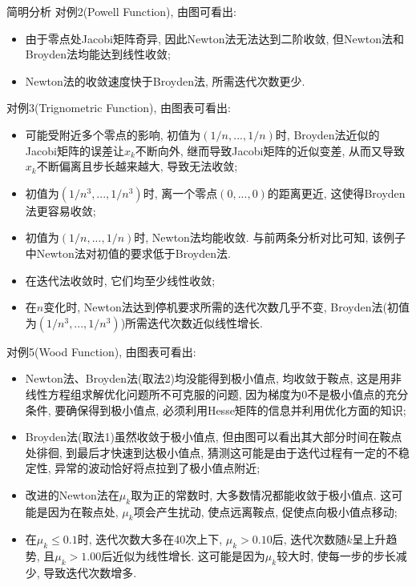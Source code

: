 \documentclass{article}
\begin{document}
\begin{section}{简明分析}
    \noindent 对例2(Powell Function), 由图可看出:
    \begin{itemize}
        \item 由于零点处Jacobi矩阵奇异, 因此Newton法无法达到二阶收敛, 但Newton法和Broyden法均能达到线性收敛; 
        \item Newton法的收敛速度快于Broyden法, 所需迭代次数更少.
    \end{itemize}

    \noindent 对例3(Trignometric Function), 由图表可看出:
    \begin{itemize}
        \item 可能受附近多个零点的影响, 初值为$(1/n,...,1/n)$时, Broyden法近似的Jacobi矩阵的误差让$x_k$不断向外, 继而导致Jacobi矩阵的近似变差, 从而又导致$x_k$不断偏离且步长越来越大, 导致无法收敛;
        \item 初值为$(1/n^3,...,1/n^3)$时, 离一个零点$(0,...,0)$的距离更近, 这使得Broyden法更容易收敛;
        \item 初值为$(1/n,...,1/n)$时, Newton法均能收敛. 与前两条分析对比可知, 该例子中Newton法对初值的要求低于Broyden法.
        \item 在迭代法收敛时, 它们均至少线性收敛; 
        \item 在$n$变化时, Newton法达到停机要求所需的迭代次数几乎不变, Broyden法(初值为$(1/n^3,...,1/n^3)$)所需迭代次数近似线性增长.
    \end{itemize}

    \noindent 对例5(Wood Function), 由图表可看出:
    \begin{itemize}
        \item Newton法、Broyden法(取法2)均没能得到极小值点, 均收敛于鞍点, 这是用非线性方程组求解优化问题所不可克服的问题, 因为梯度为0不是极小值点的充分条件, 
        要确保得到极小值点, 必须利用Hesse矩阵的信息并利用优化方面的知识;
        \item Broyden法(取法1)虽然收敛于极小值点, 但由图可以看出其大部分时间在鞍点处徘徊, 到最后才快速到达极小值点, 猜测这可能是由于迭代过程有一定的不稳定性, 异常的波动恰好将点拉到了极小值点附近;
        \item 改进的Newton法在$\mu_k$取为正的常数时, 大多数情况都能收敛于极小值点. 这可能是因为在鞍点处, $\mu_k$项会产生扰动, 使点远离鞍点, 促使点向极小值点移动;
        \item 在$\mu_k\leq 0.1$时, 迭代次数大多在40次上下, $\mu_k>0.10$后, 迭代次数随$k$呈上升趋势, 且$\mu_k>1.00$后近似为线性增长. 这可能是因为$\mu_k$较大时, 使每一步的步长减少, 导致迭代次数增多.
    \end{itemize}
\end{section}
\end{document}
